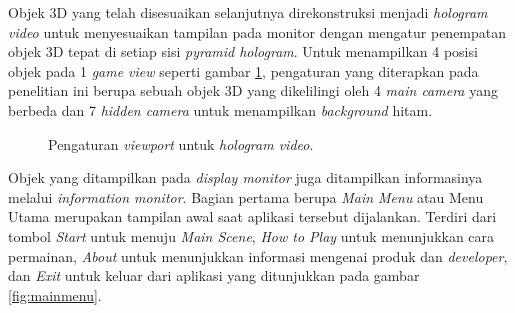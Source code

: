 \documentclass[conference]{IEEEtran}
\begin{document}
		Objek 3D yang telah disesuaikan selanjutnya direkonstruksi menjadi \textit{hologram video} untuk menyesuaikan tampilan pada monitor dengan mengatur penempatan objek 3D tepat di setiap sisi \textit{pyramid hologram}. Untuk menampilkan 4 posisi objek pada 1 \textit{game view} seperti gambar \ref{fig:unity_12cam}, pengaturan yang diterapkan pada penelitian ini berupa sebuah objek 3D yang dikelilingi oleh 4 \textit{main camera} yang berbeda dan 7 \textit{hidden camera} untuk menampilkan \textit{background} hitam.
		\begin{figure} [h]
			\vspace{-1ex}
			\caption{Pengaturan \textit{viewport} untuk \textit{hologram video}.}
			\label{fig:unity_12cam}
		\end{figure}
		\vspace{-2ex}
	
		Objek yang ditampilkan pada \textit{display monitor} juga ditampilkan informasinya melalui \textit{information monitor}. Bagian pertama berupa \textit{Main Menu} atau Menu Utama merupakan tampilan awal saat aplikasi tersebut dijalankan. Terdiri dari tombol \textit{Start} untuk menuju \textit{Main Scene}, \textit{How to Play} untuk menunjukkan cara permainan, \textit{About} untuk menunjukkan informasi mengenai produk dan \textit{developer}, dan \textit{Exit} untuk keluar dari aplikasi yang ditunjukkan pada gambar \ref{fig:mainmenu}.
		
\end{document}

